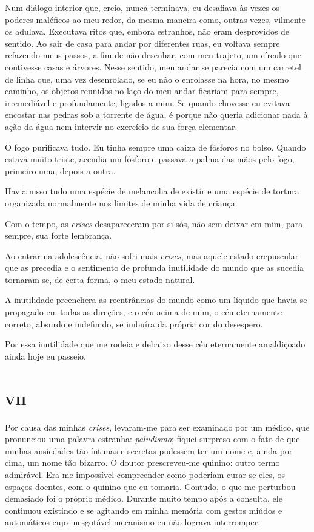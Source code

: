 Num diálogo interior que, creio, nunca terminava, eu desafiava às vezes os poderes maléficos ao meu redor, da mesma maneira como, outras vezes, vilmente os adulava. Executava ritos que, embora estranhos, não eram desprovidos de sentido. Ao sair de casa para andar por diferentes ruas, eu voltava sempre refazendo meus passos, a fim de não desenhar, com meu trajeto, um círculo que contivesse casas e árvores. Nesse sentido, meu andar se parecia com um carretel de linha que, uma vez desenrolado, se eu não o enrolasse na hora, no mesmo caminho, os objetos reunidos no laço do meu andar ficariam para sempre, irremediável e profundamente, ligados a mim. Se quando chovesse eu evitava encostar nas pedras sob a torrente de água, é porque não queria adicionar nada à ação da água nem intervir no exercício de sua força elementar.

O fogo purificava tudo. Eu tinha sempre uma caixa de fósforos no bolso. Quando estava muito triste, acendia um fósforo e passava a palma das mãos pelo fogo, primeiro uma, depois a outra.

Havia nisso tudo uma espécie de melancolia de existir e uma espécie de tortura organizada normalmente nos limites de minha vida de criança.

Com o tempo, as \textit{crises} desapareceram por si sós, não sem deixar em mim, para sempre, sua forte lembrança.

Ao entrar na adolescência, não sofri mais \textit{crises}, mas aquele estado crepuscular que as precedia e o sentimento de profunda inutilidade do mundo que as sucedia tornaram-se, de certa forma, o meu estado natural.

A inutilidade preenchera as reentrâncias do mundo como um líquido que havia se propagado em todas as direções, e o céu acima de mim, o céu eternamente correto, absurdo e indefinido, se imbuíra da própria cor do desespero. 

Por essa inutilidade que me rodeia e debaixo desse céu eternamente amaldiçoado ainda hoje eu passeio.


\chapter*{\huge\centering\textsc{vii}}

Por causa das minhas \textit{crises}, levaram-me para ser examinado por um médico, que pronunciou uma palavra estranha: \textit{paludismo}; fiquei surpreso com o fato de que minhas ansiedades tão íntimas e secretas pudessem ter um nome e, ainda por cima, um nome tão bizarro. O doutor prescreveu-me quinino: outro termo admirável. Era-me impossível compreender como poderiam curar-se eles, os espaços doentes, com o quinino que eu tomaria. Contudo, o que me perturbou demasiado foi o próprio médico. Durante muito tempo após a consulta, ele continuou existindo e se agitando em minha memória com gestos miúdos e automáticos cujo inesgotável mecanismo eu não lograva interromper.

